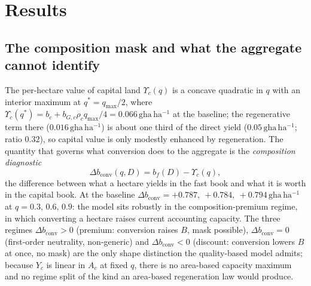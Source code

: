 \documentclass[preprint,12pt,authoryear]{elsarticle}
\newcommand{\dconv}{\Delta b_{\mathrm{conv}}}
\newcommand{\Ups}{\Upsilon_c}
\begin{document}
\section{Results}\label{sec:results}

\subsection{The composition mask and what the aggregate cannot identify}\label{sec:mask}

The per-hectare value of capital land $\Ups(q)$ is a concave quadratic in $q$ with an interior maximum at $q^*=q_{\max}/2$, where $\Ups(q^*)=b_c+b_{G,c}\rho_c q_{\max}/4=0.066\,\mathrm{gha\,ha^{-1}}$ at the baseline; the regenerative term there ($0.016\,\mathrm{gha\,ha^{-1}}$) is about one third of the direct yield ($0.05\,\mathrm{gha\,ha^{-1}}$; ratio $0.32$), so capital value is only modestly enhanced by regeneration. The quantity that governs what conversion does to the aggregate is the \emph{composition diagnostic}
\begin{equation}\label{eq:dconv}
\dconv(q,D)=b_f(D)-\Ups(q),
\end{equation}
the difference between what a hectare yields in the fast book and what it is worth in the capital book. At the baseline $\dconv=+0.787,\ +0.784,\ +0.794\,\mathrm{gha\,ha^{-1}}$ at $q=0.3,\,0.6,\,0.9$: the model sits robustly in the composition-premium regime, in which converting a hectare raises current accounting capacity. The three regimes $\dconv>0$ (premium: conversion raises $B$, mask possible), $\dconv=0$ (first-order neutrality, non-generic) and $\dconv<0$ (discount: conversion lowers $B$ at once, no mask) are the only shape distinction the quality-based model admits; because $Y_c$ is linear in $A_c$ at fixed $q$, there is no area-based capacity maximum and no regime split of the kind an area-based regeneration law would produce.
\end{document}
